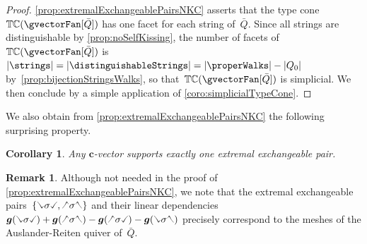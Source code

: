 \documentclass{amsart}
\newtheorem{corollary}[theorem]{Corollary}
\theoremstyle{definition}
\newtheorem{remark}[theorem]{Remark}
\renewcommand{\b}[1]{{\boldsymbol{#1}}} %
\newcommand{\vincent}[1]{\todo[color=blue!30]{#1 \\ \hfill --- V.}}
\newcommand{\gvector}[1]{\b{g}(#1)} %
\newcommand{\typeCone}{\mathbb{TC}} %
\newcommand{\quiver}{\bar Q} %
\newcommand{\hL}{\text{\rotatebox[origin=c]{180}{\checked}}}
\newcommand{\hR}{\text{\rotatebox[origin=c]{180}{\reflectbox{\checked}}}}
\newcommand{\cL}{\text{\reflectbox{\checked}}}
\newcommand{\cR}{\text{\checked}}
\newcommand{\hh}[1]{\hL#1\hR} %
\newcommand{\cc}[1]{\cL#1\cR} %
\newcommand{\hc}[1]{\hL#1\cR} %
\newcommand{\ch}[1]{\cL#1\hR} %
\begin{document}
\begin{proof}
\cref{prop:extremalExchangeablePairsNKC} asserts that the type cone~$\typeCone(\gvectorFan[\quiver])$ has one facet for each string of~$\quiver$.
Since all strings are distinguishable by \cref{prop:noSelfKissing}, the number of facets of~$\typeCone(\gvectorFan[\quiver])$ is $|\strings| = |\distinguishableStrings| = |\properWalks| - |Q_0|$ by~\cref{prop:bijectionStringsWalks}, so that~$\typeCone(\gvectorFan[\quiver])$ is simplicial. We then conclude by a simple application of \cref{coro:simplicialTypeCone}.
\end{proof}

We also obtain from \cref{prop:extremalExchangeablePairsNKC} the following surprising property.

\begin{corollary}
Any $\b{c}$-vector supports exactly one extremal exchangeable pair.
\end{corollary}

\begin{remark}
\label{rem:meshARquiver}
Although not needed in the proof of \cref{prop:extremalExchangeablePairsNKC}, we note that the extremal exchangeable pairs~$\{\cc{\sigma}, \hh{\sigma}\}$ and their linear dependencies~${\gvector{\cc{\sigma}} + \gvector{\hh{\sigma}} - \gvector{\hc{\sigma}} - \gvector{\ch{\sigma}}}$ precisely correspond to the meshes of the Auslander-Reiten quiver of~$\quiver$.
\end{remark}

\end{document}
